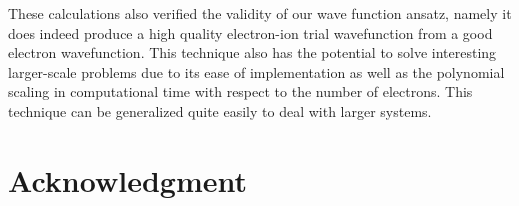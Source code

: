 \documentclass[pra,superscriptaddress,groupedaddress,twocolumn]{revtex4}
\begin{document}
These calculations also verified the validity of our wave function ansatz, namely it does indeed produce a high quality electron-ion trial wavefunction from a good electron wavefunction. This technique also has the potential to solve interesting larger-scale problems due to its ease of implementation as well as the polynomial scaling in computational time with respect to the number of electrons.  This technique can be generalized quite easily to deal with larger systems.

\section{Acknowledgment}



\end{document}
